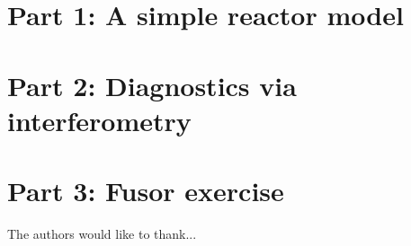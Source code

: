 \documentclass[aps, prb, a4paper, english, 12pt, onecolumn, longbibliography, amsmath, amssymb, colorinlistoftodos, floatfix]{revtex4-1}
\begin{document}
\section{Part 1: A simple reactor model}

\section{Part 2: Diagnostics via interferometry}

\section{Part 3: Fusor exercise}

\begin{acknowledgments}
	The authors would like to thank...
\end{acknowledgments}
\listoftodos

\newpage
\onecolumngrid


\newpage
\listoffigures
\listoftables
\listoflistings
\newpage

\end{document}
